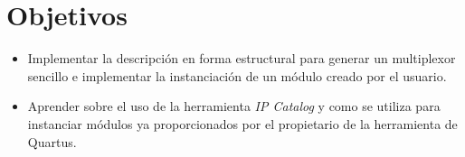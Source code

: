 \section{Objetivos \label{sec:obj}}


\begin{itemize} 
	\item Implementar la descripción en forma estructural para generar un multiplexor sencillo e implementar la instanciación de un módulo creado por el usuario.
	
	\item Aprender sobre el uso de la herramienta \textit{IP Catalog} y como se utiliza para instanciar módulos ya proporcionados por el propietario de la herramienta de Quartus.
\end{itemize}